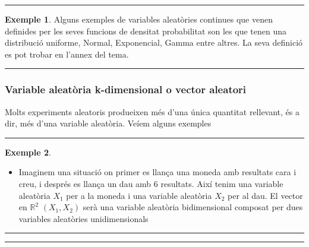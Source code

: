 \documentclass[
  catalan,
]{article}
\providecommand{\tightlist}{%
  \setlength{\itemsep}{0pt}\setlength{\parskip}{0pt}}
\theoremstyle{definition}
\theoremstyle{definition}
\newtheorem{example}{Exemple}[section]
\theoremstyle{definition}
\theoremstyle{definition}
\theoremstyle{remark}
\begin{document}
\begin{center}\rule{0.5\linewidth}{0.5pt}\end{center}

\begin{example}
Alguns exemples de variables aleatòries continues que venen definides per les seves funcions de densitat probabilitat son les que tenen una distribució uniforme, Normal, Exponencial, Gamma entre altres. La seva definició es pot trobar en l'annex del tema.
\end{example}

\begin{center}\rule{0.5\linewidth}{0.5pt}\end{center}

\subsubsection{Variable aleatòria k-dimensional o vector aleatori}\label{variable-aleatuxf2ria-k-dimensional-o-vector-aleatori}

Molts experiments aleatoris produeixen més d'una única quantitat rellevant, és a dir, més d'una variable aleatòria. Veíem alguns exemples

\begin{center}\rule{0.5\linewidth}{0.5pt}\end{center}

\begin{example}
\protect\hypertarget{exm:quali1}{}\label{exm:quali1}\leavevmode

\begin{itemize}
\tightlist
\item
  Imaginem una situació on primer es llança una moneda amb resultats cara i creu, i després es llança un dau amb 6 resultats. Així tenim una variable aleatòria \(X_1\) per a la moneda i una variable aleatòria \(X_2\) per al dau. El vector en \(\mathbb{R}^2\) \((X_1,X_2)\) serà una variable aleatòria bidimensional composat per dues variables aleatòries unidimensionals
\end{itemize}

\end{example}

\begin{center}\rule{0.5\linewidth}{0.5pt}\end{center}

\begin{center}\rule{0.5\linewidth}{0.5pt}\end{center}
\end{document}
